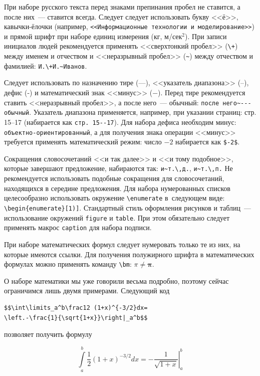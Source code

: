 При наборе русского текста перед знаками препинания пробел не ставится, 
а после них~--- ставится всегда. Следует следует использовать букву <<ё>>, 
кавычки-ёлочки 
(например, \verb|<<Информационные технологии и моделирование>>|) и
прямой шрифт при наборе единиц измерения (кг, м/сек${}^2$).
При записи инициалов людей рекомендуется применять <<сверхтонкий пробел>> 
(\verb|\+|) между именем и отчеством и <<неразрывный пробел>> (\verb|~|) между
отчеством и фамилией: \verb|И.\+И.~Иванов|. 

Следует использовать по назначению тире
(---), <<указатель диапазона>> (--), дефис (-) и математический знак <<минус>>
($-$). Перед тире рекомендуется ставить <<неразрывный
пробел>>, а после него~--- обычный: \verb|после него~--- обычный|. Указатель
диапазона применяется, например, при указании страниц: стр. 15--17
(набирается как \verb|стр. 15--17|). Для набора дефиса необходим минус: 
\verb|объектно-ориентированный|, а для получения знака операции  <<минус>>
требуется применять математический режим: число $-2$ набирается как
\verb|$-2$|. 

Сокращения словосочетаний <<и так далее>> и <<и тому подобное>>, которые
завершают предложение, набираются так: \verb|и~т.\,д.|, \verb|и~т.\,п.|
Не рекомендуется использовать подобные сокращения для словосочетаний,
находящихся в середине предложения. Для набора нумерованных списков 
целесообразно использовать окружение \verb|\enumerate| в~следующем виде:
\verb|\begin{enumerate}[1)]|.
Стандартный стиль оформления рисунков и таблиц~--- использование окружений
\verb|figure| и \verb|table|. При этом обязательно следует применять макрос
\verb|caption| для набора подписи. 

При наборе математических формул следует нумеровать только те из них, на
которые имеются ссылки. Для получения полужирного шрифта в математических
формулах можно применять команду \verb|\bm|: $\pi \ne \bm\pi$.

О наборе математики мы уже говорили весьма подробно, поэтому сейчас 
ограничимся лишь двумя примерами. Следующий код
\begin{small}
\begin{verbatim}
$$\int\limits_a^b\frac12 (1+x)^{-3/2}dx=
\left.-\frac{1}{\sqrt{1+x}}\right|_a^b$$
\end{verbatim}
\end{small}
\noindent позволяет получить формулу

$$\int\limits_a^b\frac12 (1+x)^{-3/2}dx=
\left.-\frac{1}{\sqrt{1+x}}\right|_a^b$$

